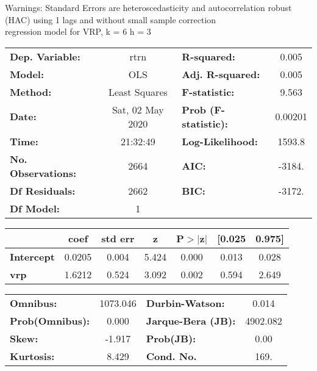 Warnings: \newline
 [1] Standard Errors are heteroscedasticity and autocorrelation robust (HAC) using 1 lags and without small sample correction\\ 

regression model for VRP, k = 6 h = 3\begin{center}
\begin{tabular}{lclc}
\toprule
\textbf{Dep. Variable:}    &       rtrn       & \textbf{  R-squared:         } &     0.005   \\
\textbf{Model:}            &       OLS        & \textbf{  Adj. R-squared:    } &     0.005   \\
\textbf{Method:}           &  Least Squares   & \textbf{  F-statistic:       } &     9.563   \\
\textbf{Date:}             & Sat, 02 May 2020 & \textbf{  Prob (F-statistic):} &  0.00201    \\
\textbf{Time:}             &     21:32:49     & \textbf{  Log-Likelihood:    } &    1593.8   \\
\textbf{No. Observations:} &        2664      & \textbf{  AIC:               } &    -3184.   \\
\textbf{Df Residuals:}     &        2662      & \textbf{  BIC:               } &    -3172.   \\
\textbf{Df Model:}         &           1      & \textbf{                     } &             \\
\bottomrule
\end{tabular}
\begin{tabular}{lcccccc}
                   & \textbf{coef} & \textbf{std err} & \textbf{z} & \textbf{P$> |$z$|$} & \textbf{[0.025} & \textbf{0.975]}  \\
\midrule
\textbf{Intercept} &       0.0205  &        0.004     &     5.424  &         0.000        &        0.013    &        0.028     \\
\textbf{vrp}       &       1.6212  &        0.524     &     3.092  &         0.002        &        0.594    &        2.649     \\
\bottomrule
\end{tabular}
\begin{tabular}{lclc}
\textbf{Omnibus:}       & 1073.046 & \textbf{  Durbin-Watson:     } &    0.014  \\
\textbf{Prob(Omnibus):} &   0.000  & \textbf{  Jarque-Bera (JB):  } & 4902.082  \\
\textbf{Skew:}          &  -1.917  & \textbf{  Prob(JB):          } &     0.00  \\
\textbf{Kurtosis:}      &   8.429  & \textbf{  Cond. No.          } &     169.  \\
\bottomrule
\end{tabular}
\end{center}

